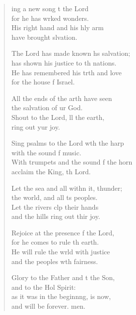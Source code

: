 \settowidth{\versewidth}{With trumpets and the sound of the horn *}
\begin{verse}%
  \begin{patverse}
ing a new song t the Lord\Med\\
for he has wrked wonders.\\
His right hand and his hly arm\Med\\
have brought slvation.

The Lord has made known h\pointup{\i}s salvation;\Med\\
has shown his justice to th nations.\\
He has remembered his trth and love\Med\\
for the house f Israel.

All the ends of the arth have seen\Med\\
the salvation of ur God.\\
Shout to the Lord, ll the earth,\Med\\
ring out yur joy.

Sing psalms to the Lord w\pointup{\i}th the harp\Med\\
with the sound f music.\\
With trumpets and the sound f the horn\Med\\
acclaim the King, th Lord.

Let the sea and all with\pointup{\i}n it, thunder;\Med\\
the world, and all \pointup{\i}ts peoples.\\
Let the rivers clp their hands\Med\\
and the hills ring out thir joy.

Rejoice at the presence f the Lord,\Med\\
for he comes to rule th earth.\\
He will rule the wrld with justice\Med\\
and the peoples w\pointup{\i}th fairness.

Glory to the Father and t the Son,\Med\\
and to the Hol Spirit:\\
as it was in the beginn\pointup{\i}ng, is now,\Med\\
and will be forever. men. 
  \end{patverse}
\end{verse}
